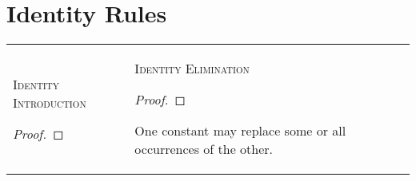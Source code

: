 {\section*{Identity Rules}

\begin{longtabu}{X[1,l]X[1,l]}
\textsc{Identity Introduction}\vspace{.5ex}
\begin{proof}
	 
\end{proof}\vspace{.5ex}

&

\textsc{Identity Elimination}\vspace{.5ex}
\begin{proof}	
	 	 
\end{proof} \vspace{9pt}

One constant may replace some or all occurrences of the other.\vspace{.5ex}

\end{longtabu}
}{}

